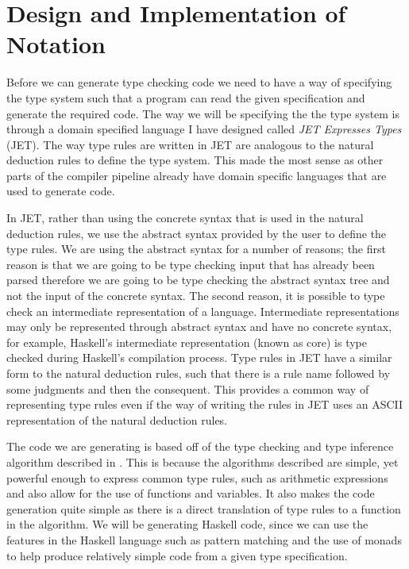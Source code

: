 \chapter{Design and Implementation of Notation}
\label{chap:Method}
Before we can generate type checking code we need to have a way of specifying the type system such that a program can read the given specification and generate the required code.
The way we will be specifying the the type system is through a domain specified language I have designed called \textit{JET Expresses Types} (JET).
The way type rules are written in JET are analogous to the natural deduction rules to define the type system.
This made the most sense as other parts of the compiler pipeline already have domain specific languages that are used to generate code.

In JET, rather than using the concrete syntax that is used in the natural deduction rules, we use the abstract syntax provided by the user to define the type rules.
We are using the abstract syntax for a number of reasons; the first reason is that we are going to be type checking input that has already been parsed therefore we are going to be type checking the abstract syntax tree and not the input of the concrete syntax.
The second reason, it is possible to type check an intermediate representation of a language.
Intermediate representations may only be represented through abstract syntax and have no concrete syntax, for example, Haskell's intermediate representation (known as core) is type checked during Haskell's compilation process\cite{marlow2004glasgow}.
Type rules in JET have a similar form to the natural deduction rules, such that there is a rule name followed by some judgments and then the consequent.
This provides a common way of representing type rules even if the way of writing the rules in JET uses an ASCII representation of the natural deduction rules.

The code we are generating is based off of the type checking and type inference algorithm described in \textcite{ranta2012implementing}.
This is because the algorithms described are simple, yet powerful enough to express common type rules, such as arithmetic expressions and also allow for the use of functions and variables.
It also makes the code generation quite simple as there is a direct translation of type rules to a function in the algorithm.
We will be generating Haskell code, since we can use the features in the Haskell language such as pattern matching and the use of monads to help produce relatively simple code from a given type specification.


